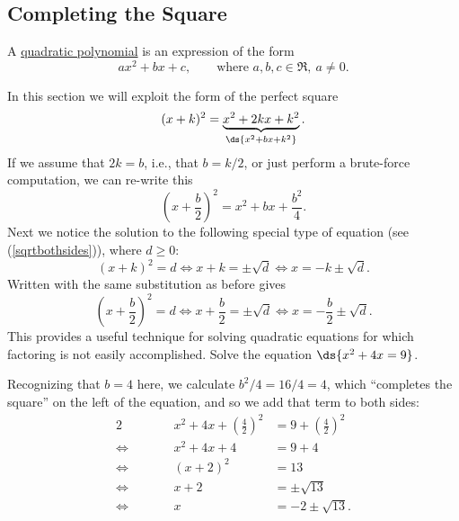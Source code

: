 \subsection{Completing the Square}
\begin{definition} A \underline{quadratic polynomial} is
an expression of the form 
\begin{equation}ax^2+bx+c,\qquad\text{where\ }a,b,c\in\Re, \ a\ne0.
\end{equation}
\end{definition}
In this section we will exploit the form of the perfect square
\begin{equation*} (x+k)^2=\underbrace{x^2+2kx+k^2}_{\ds{x^2+bx+k^2}}.\end{equation*}
If we assume that $2k=b$, i.e., that $b=k/2$, or just
perform a brute-force computation, we can re-write this
\begin{equation} \left(x+\frac{b}2\right)^2=x^2+bx+\frac{b^2}{4}.\end{equation}
Next  we notice the solution to the following special type of 
equation (see (\ref{sqrtbothsides})), where $d\ge0$:
\begin{equation}
(x+k)^2=d\iff x+k=\pm \sqrt{d}\iff x=-k\pm\sqrt{ d} .\end{equation}
Written with the same substitution as before gives
\begin{equation}
\left(x+\frac{b}2\right)^2=d\iff x+\frac{b}2=\pm\sqrt{d}
\iff x=-\frac{b}2\pm\sqrt{d}.\end{equation} 
This provides a useful technique for solving quadratic equations
for which factoring is not easily accomplished. 
\bex
Solve the equation $\ds{x^2+4x=9}$.

Recognizing that $b=4$ here, we calculate $b^2/4=16/4=4$, which
``completes the square'' on the left of the equation, and
so we add that term to both sides:
\begin{alignat*}{2} 
&&x^2+4x+\left(\frac42\right)^2&=9+\left(\frac42\right)^2\\
\iff&\qquad&x^2+4x+4&=9+4\\
\iff&&(x+2)^2&=13\\
\iff&&x+2&=\pm\sqrt{13}\\
\iff&&x&=-2\pm\sqrt{13}.
\end{alignat*} 


\eex 


